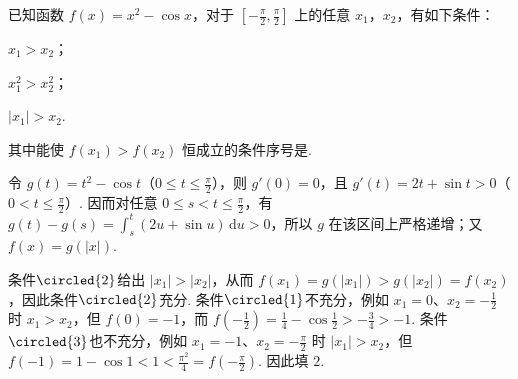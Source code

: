 \begin{problem}
已知函数 \( f(x) = x^2 - \cos x \)，对于 \( \left[-\frac{\pi}{2}, \frac{\pi}{2}\right] \) 上的任意 \(x_1\)，\(x_2\)，有如下条件：

\begin{circlelist}
\item \( x_1 > x_2 \)；
\item \( x_1^2 > x_2^2 \)；
\item \( |x_1| > x_2 \).
\end{circlelist}

其中能使 \( f(x_1) > f(x_2) \) 恒成立的条件序号是\fillinblank{}.

\begin{answer}
\end{answer}

\begin{solution}
令 \(g(t)=t^2-\cos t\)（\(0\leqslant t\leqslant\frac\pi2\)），则 \(g'(0)=0\)，且 \(g'(t)=2t+\sin t>0\)（\(0<t\leqslant\frac\pi2\)）. 因而对任意 \(0\leqslant s<t\leqslant\frac\pi2\)，有 \(g(t)-g(s)=\int_s^t(2u+\sin u)\,\mathrm du>0\)，所以 \(g\) 在该区间上严格递增；又 \(f(x)=g(|x|)\).

条件\(\circled{2}\)给出 \(|x_1|>|x_2|\)，从而 \(f(x_1)=g(|x_1|)>g(|x_2|)=f(x_2)\)，因此条件\(\circled{2}\)充分. 条件\(\circled{1}\)不充分，例如 \(x_1=0\)、\(x_2=-\frac12\) 时 \(x_1>x_2\)，但 \(f(0)=-1\)，而 \(f\left(-\frac12\right)=\frac14-\cos\frac12>-\frac34>-1\). 条件\(\circled{3}\)也不充分，例如 \(x_1=-1\)、\(x_2=-\frac\pi2\) 时 \(|x_1|>x_2\)，但 \(f(-1)=1-\cos1<1<\frac{\pi^2}{4}=f\left(-\frac\pi2\right)\). 因此填 \(2\).
\end{solution}
\end{problem}

